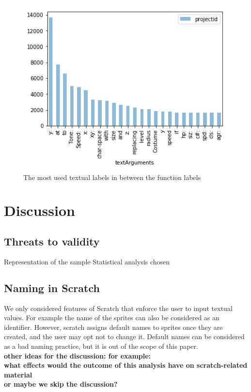 \documentclass[conference]{IEEEtran}
\newcommand{\todo}[1]{ \textbf{#1} }
\begin{document}
\begin{figure}
	\begin{center}
		\includegraphics[width=\columnwidth]{fig/text_in_the_middle_func_occurrences}
		\caption{The most used textual labels in between the function labels }
		\label{fig:labels}
	\end{center}
\end{figure} 



 \section{Discussion}
\subsection{Threats to validity}
Representation of the sample
Statistical analysis chosen
\subsection{Naming in Scratch}
We only considered features of Scratch that enforce the user to input textual values. For example the name of the sprites can also be considered as an identifier. However, scratch assigns default names to sprites once they are created, and the user may opt not to change it. Default names can be considered as a bad naming practice, but it is out of the scope of this paper.\\
\todo{other ideas for the discussion: for example: \\
what effects would the outcome of this analysis have on scratch-related material\\
or maybe we skip the discussion?
}
\end{document}
